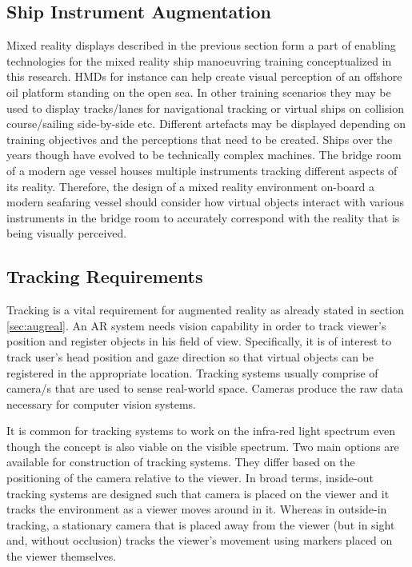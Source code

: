 \subsection{Ship Instrument Augmentation}

Mixed reality displays described in the previous section form a part of enabling technologies for the mixed reality ship manoeuvring training conceptualized in this research. HMDs for instance can help create visual perception of an offshore oil platform standing on the open sea. In other training scenarios they may be used to display tracks/lanes for navigational tracking or virtual ships on collision course/sailing side-by-side etc. Different artefacts may be displayed depending on training objectives and the perceptions that need to be created. Ships over the years though have evolved to be technically complex machines. The bridge room of a modern age vessel houses multiple instruments tracking different aspects of its reality. Therefore, the design of a mixed reality environment on-board a modern seafaring vessel should consider how virtual objects interact with various instruments in the bridge room to accurately correspond with the reality that is being visually perceived.  
%
%

\subsection{Tracking Requirements}
Tracking is a vital requirement for augmented reality as already stated in section \ref{sec:augreal}. An AR system needs vision capability in order to track viewer’s position and register objects in his field of view. Specifically, it is of interest to track user's head position and gaze direction so that virtual objects can be registered in the appropriate location. Tracking systems usually comprise of camera/s that are used to sense real-world space. Cameras produce the raw data necessary for computer vision systems.   

It is common for tracking systems to work on the infra-red light spectrum even though the concept is also viable on the visible spectrum. Two main options are available for construction of tracking systems. They differ based on the positioning of the camera relative to the viewer. In broad terms, inside-out tracking systems are designed such that camera is placed on the viewer and it tracks the environment as a viewer moves around in it. Whereas in outside-in tracking, a stationary camera that is placed away from the viewer (but in sight and, without occlusion) tracks the viewer’s movement using markers placed on the viewer themselves. 

